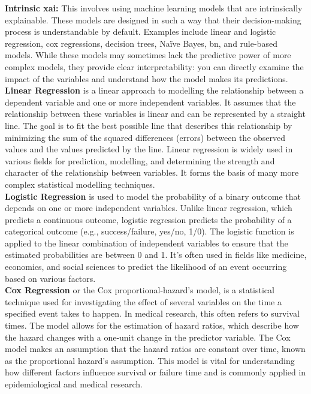 \textbf{Intrinsic \ac{xai}:} This involves using machine learning models that are intrinsically explainable. These models are designed in such a way that their decision-making process is understandable by default. Examples include linear and logistic regression, cox regressions, decision trees, Naïve Bayes, \ac{bn}, and rule-based models. While these models may sometimes lack the predictive power of more complex models, they provide clear interpretability: you can directly examine the impact of the variables and understand how the model makes its predictions.
\\
\textbf{Linear Regression} is a linear approach to modelling the relationship between a dependent variable and one or more independent variables. It assumes that the relationship between these variables is linear and can be represented by a straight line. The goal is to fit the best possible line that describes this relationship by minimizing the sum of the squared differences (errors) between the observed values and the values predicted by the line. Linear regression is widely used in various fields for prediction, modelling, and determining the strength and character of the relationship between variables. It forms the basis of many more complex statistical modelling techniques.
\\
\textbf{Logistic Regression} is used to model the probability of a binary outcome that depends on one or more independent variables. Unlike linear regression, which predicts a continuous outcome, logistic regression predicts the probability of a categorical outcome (e.g., success/failure, yes/no, 1/0). The logistic function is applied to the linear combination of independent variables to ensure that the estimated probabilities are between 0 and 1. It's often used in fields like medicine, economics, and social sciences to predict the likelihood of an event occurring based on various factors.
\\
\textbf{Cox Regression} or the Cox proportional-hazard's model, is a statistical technique used for investigating the effect of several variables on the time a specified event takes to happen. In medical research, this often refers to survival times. The model allows for the estimation of hazard ratios, which describe how the hazard changes with a one-unit change in the predictor variable. The Cox model makes an assumption that the hazard ratios are constant over time, known as the proportional hazard's assumption. This model is vital for understanding how different factors influence survival or failure time and is commonly applied in epidemiological and medical research.

